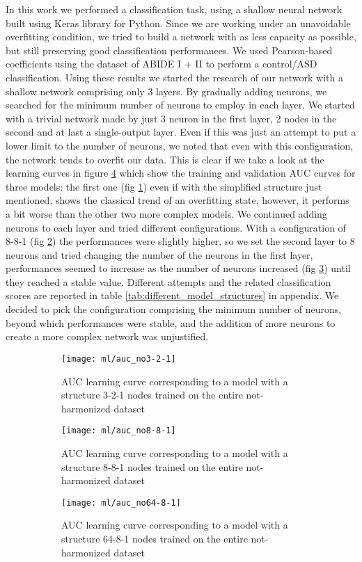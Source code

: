 \documentclass[11pt]{report}
\begin{document}
In this work we performed a classification task, using a shallow neural network built using Keras library for Python.
Since we are working under an unavoidable overfitting condition, we tried to build a network with as less capacity as possible, but still preserving good classification performances.
We used Pearson-based coefficients using the dataset of ABIDE I + II to perform a control/ASD classification.
Using these results we started the research of our network with a shallow network comprising only 3 layers.
By gradually adding neurons, we searched for the minimum number of neurons to employ in each layer.
We started with a trivial network made by just 3 neuron in the first layer, 2 nodes in the second and at last a single-output layer.
Even if this was just an attempt to put a lower limit to the number of neurons, we noted that even with this configuration, the network tends to overfit our data.
This is clear if we take a look at the learning curves in figure \ref{fig:learningcurve} which show the training and validation AUC curves for three models: the first one (fig \ref{fig:auc_no3-2-1}) even if with the simplified structure just mentioned, shows the classical trend of an overfitting state, however, it performs a bit worse than the other two more complex models.
We continued adding neurons to each layer and tried different configurations. With a configuration of 8-8-1 (fig \ref{fig:auc_no8-8-1}) the performances were slightly higher, so we set the second layer to 8 neurons and tried changing the number of the neurons in the first layer, performances seemed to increase as the number of neurons increased (fig \ref{fig:auc_no64-8-1}) until they reached a stable value.
Different attempts and the related classification scores are reported in table \ref{tab:different_model_structures} in appendix.
We decided to pick the configuration comprising the minimum number of neurons, beyond which performances were stable, and the addition of more neurons to create a more complex network was unjustified.

\begin{figure}
\centering
\begin{subfigure}[b]{0.3\textwidth}
   \texttt{[image: ml/auc\_no3-2-1]}
   \caption{AUC learning curve corresponding to a model with a structure 3-2-1 nodes trained on the entire not-harmonized dataset}
   \label{fig:auc_no3-2-1}
\end{subfigure}
\begin{subfigure}[b]{0.3\textwidth}
   \texttt{[image: ml/auc\_no8-8-1]}
   \caption{AUC learning curve corresponding to a model with a structure 8-8-1 nodes trained on the entire not-harmonized dataset}
   \label{fig:auc_no8-8-1}
\end{subfigure}
\begin{subfigure}[b]{0.3\textwidth}
   \texttt{[image: ml/auc\_no64-8-1]}
   \caption{AUC learning curve corresponding to a model with a structure 64-8-1 nodes trained on the entire not-harmonized dataset}
   \label{fig:auc_no64-8-1}
\end{subfigure}
\caption{}
\label{fig:learningcurve}
\end{figure}
\end{document}
